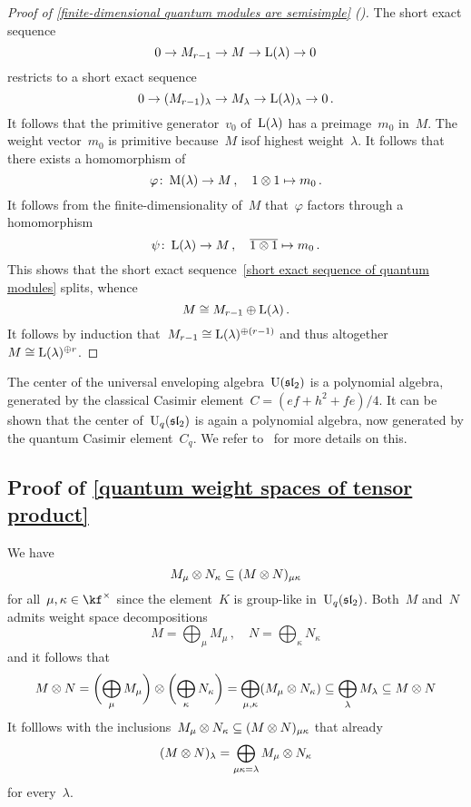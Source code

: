 \documentclass[a4paper, 11pt, oneside]{scrartcl}
\begin{document}
\begin{proof}[Proof of \cref{finite-dimensional quantum modules are semisimple} ({\cite[Theorem~2.9]{jantzen_quantum}})]
  The short exact sequence
  \begin{equation}
    \label{short exact sequence of quantum modules}
    0
    \to
    M_{r-1}
    \to
    M
    \to
    \operatorname{L}(\lambda)
    \to
    0
  \end{equation}
  restricts to a short exact sequence
  \[
    0
    \to
    ( M_{r-1} )_\lambda
    \to
    M_\lambda
    \to
    \operatorname{L}(\lambda)_\lambda
    \to
    0 \,.
  \]
  It follows that the primitive generator~$v_0$ of~$\operatorname{L}(\lambda)$ has a preimage~$m_0$ in~$M$.
  The weight vector~$m_0$ is primitive because~$M$ isof highest weight~$\lambda$.
  It follows that there exists a homomorphism of~
  \[
    \varphi
    \colon
    \operatorname{M}(\lambda)
    \to
    M
    \,,
    \quad
    1 \otimes 1
    \mapsto
    m_0 \,.
  \]
  It follows from the finite-dimensionality of~$M$ that~$\varphi$ factors through a homomorphism
  \[
    \psi
    \colon
    \operatorname{L}(\lambda)
    \to
    M
    \,,
    \quad
    \overline{1 \otimes 1}
    \mapsto
    m_0 \,.
  \]
  This shows that the short exact sequence~\eqref{short exact sequence of quantum modules} splits, whence
  \[
    M \cong M_{r-1} \oplus \operatorname{L}(\lambda) \,.
  \]
  It follows by induction that~$M_{r-1} \cong \operatorname{L}(\lambda)^{\oplus (r-1)}$ and thus altogether~$M \cong \operatorname{L}(\lambda)^{\oplus r}$.
\end{proof}

\begin{remark}
  The center of the universal enveloping algebra~$\operatorname{U}(\mathfrak{sl}_2)$ is a polynomial algebra, generated by the classical Casimir element~$C = (ef + h^2 + fe)/4$.
  It can be shown that the center of~$\operatorname{U}_q(\mathfrak{sl}_2)$ is again a polynomial algebra, now generated by the quantum Casimir element~$C_q$.
  We refer to~\cite[Proposition~2.18]{jantzen_quantum} for more details on this.
\end{remark}



\subsection{Proof of \cref{quantum weight spaces of tensor product}}
\label{proof of quantum weight spaces of tensor product}

We have
\[
  M_\mu \otimes N_\kappa
  \subseteq
  (M \otimes N)_{\mu \kappa}
\]
for all~$\mu, \kappa \in \kf^\times$ since the element~$K$ is group-like in~$\operatorname{U}_q(\mathfrak{sl}_2)$.
Both~$M$ and~$N$ admits weight space decompositions
\[
  M = \bigoplus_\mu M_\mu \,,
  \quad
  N = \bigoplus_\kappa N_\kappa
\]
and it follows that
\[
  M \otimes N
  =
  \biggl( \bigoplus_\mu M_\mu  \biggr)
  \otimes
  \biggl( \bigoplus_\kappa N_\kappa  \biggr)
  =
  \bigoplus_{\mu, \kappa} (M_\mu \otimes N_\kappa)
  \subseteq
  \bigoplus_{\lambda} M_{\lambda}
  \subseteq
  M \otimes N
\]
It folllows with the inclusions~$M_\mu \otimes N_\kappa \subseteq (M \otimes N)_{\mu \kappa}$ that already
\[
  (M \otimes N)_{\lambda}
  =
  \bigoplus_{\mu \kappa = \lambda}
  M_\mu \otimes N_\kappa
\]
for every~$\lambda$.
\end{document}
